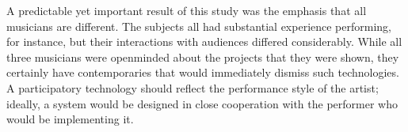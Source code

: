 A predictable yet important result of this study was the emphasis that all musicians are different. The subjects all had substantial experience performing, for instance, but their interactions with audiences differed considerably. While all three musicians were openminded about the projects that they were shown, they certainly have contemporaries that would immediately dismiss such technologies. A participatory technology should reflect the performance style of the artist; ideally, a system would be designed in close cooperation with the performer who would be implementing it.

